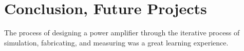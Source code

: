 ﻿\chapter{Conclusion, Future Projects}

The process of designing a power amplifier through the iterative process of simulation, fabricating, and measuring was a great learning experience.  